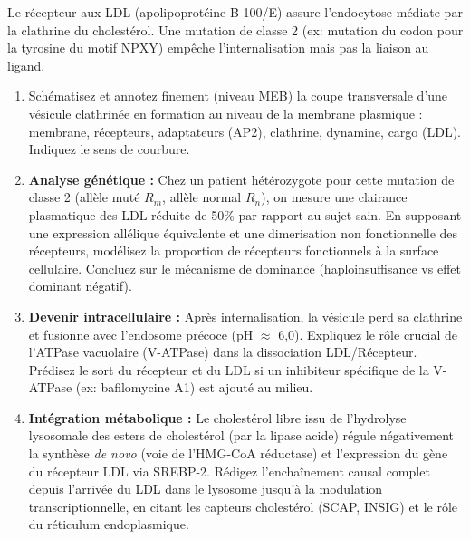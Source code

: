 \documentclass[11pt]{article}
\begin{document}
\begin{exercice}
Le récepteur aux LDL (apolipoprotéine B-100/E) assure l'endocytose médiate par la clathrine du cholestérol. Une mutation de classe 2 (ex: mutation du codon pour la tyrosine du motif NPXY) empêche l'internalisation mais pas la liaison au ligand.

\begin{enumerate}
    \item Schématisez et annotez finement (niveau MEB) la coupe transversale d'une vésicule clathrinée en formation au niveau de la membrane plasmique : membrane, récepteurs, adaptateurs (AP2), clathrine, dynamine, cargo (LDL). Indiquez le sens de courbure.
    \item \textbf{Analyse génétique :} Chez un patient hétérozygote pour cette mutation de classe 2 (allèle muté $R_m$, allèle normal $R_n$), on mesure une clairance plasmatique des LDL réduite de 50\% par rapport au sujet sain. En supposant une expression allélique équivalente et une dimerisation non fonctionnelle des récepteurs, modélisez la proportion de récepteurs fonctionnels à la surface cellulaire. Concluez sur le mécanisme de dominance (haploinsuffisance vs effet dominant négatif).
    \item \textbf{Devenir intracellulaire :} Après internalisation, la vésicule perd sa clathrine et fusionne avec l'endosome précoce (pH $\approx$ 6,0). Expliquez le rôle crucial de l'ATPase vacuolaire (V-ATPase) dans la dissociation LDL/Récepteur. Prédisez le sort du récepteur et du LDL si un inhibiteur spécifique de la V-ATPase (ex: bafilomycine A1) est ajouté au milieu.
    \item \textbf{Intégration métabolique :} Le cholestérol libre issu de l'hydrolyse lysosomale des esters de cholestérol (par la lipase acide) régule négativement la synthèse \textit{de novo} (voie de l'HMG-CoA réductase) et l'expression du gène du récepteur LDL via SREBP-2. Rédigez l'enchaînement causal complet depuis l'arrivée du LDL dans le lysosome jusqu'à la modulation transcriptionnelle, en citant les capteurs cholestérol (SCAP, INSIG) et le rôle du réticulum endoplasmique.
\end{enumerate}
\end{exercice}
\end{document}
